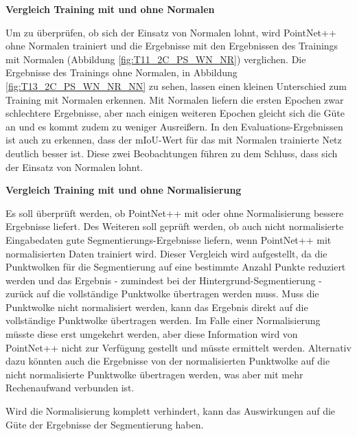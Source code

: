 \documentclass[12pt,titlepage, twoside]{article}
\begin{document}
\newpage

\textbf{Vergleich Training mit und ohne Normalen}

Um zu überprüfen, ob sich der Einsatz von Normalen lohnt, wird PointNet++ ohne Normalen trainiert und die Ergebnisse mit den Ergebnissen des Trainings mit Normalen (Abbildung \ref{fig:T11_2C_PS_WN_NR}) verglichen. 
Die Ergebnisse des Trainings ohne Normalen, in Abbildung \ref{fig:T13_2C_PS_WN_NR_NN} zu sehen, lassen einen kleinen Unterschied zum Training mit Normalen erkennen. 
Mit Normalen liefern die ersten Epochen zwar schlechtere Ergebnisse, aber nach einigen weiteren Epochen gleicht sich die Güte an und es kommt zudem zu weniger Ausreißern. 
In den Evaluations-Ergebnissen ist auch zu erkennen, dass der mIoU-Wert für das mit Normalen trainierte Netz deutlich besser ist. 
Diese zwei Beobachtungen führen zu dem Schluss, dass sich der Einsatz von Normalen lohnt.

\textbf{Vergleich Training mit und ohne Normalisierung} 

Es soll überprüft werden, ob PointNet++ mit oder ohne Normalisierung bessere Ergebnisse liefert. 
Des Weiteren soll geprüft werden, ob auch nicht normalisierte Eingabedaten gute Segmentierungs-Ergebnisse liefern, wenn PointNet++ mit normalisierten Daten trainiert wird.
Dieser Vergleich wird aufgestellt, da die Punktwolken für die Segmentierung auf eine bestimmte Anzahl Punkte reduziert werden und das Ergebnis - zumindest bei der Hintergrund-Segmentierung - 
zurück auf die vollständige Punktwolke übertragen werden muss.
Muss die Punktwolke nicht normalisiert werden, kann das Ergebnis direkt auf die vollständige Punktwolke übertragen werden. 
Im Falle einer Normalisierung müsste diese erst umgekehrt werden, aber diese Information wird von PointNet++ nicht zur Verfügung gestellt und müsste ermittelt werden.
Alternativ dazu könnten auch die Ergebnisse von der normalisierten Punktwolke auf die nicht normalisierte Punktwolke übertragen werden, was aber mit mehr Rechenaufwand verbunden ist.

Wird die Normalisierung komplett verhindert, kann das Auswirkungen auf die Güte der Ergebnisse der Segmentierung haben.
\end{document}
